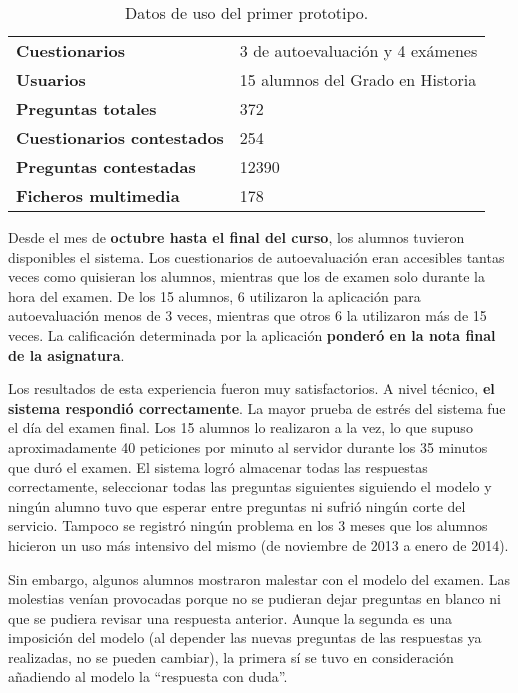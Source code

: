 \begin{table}[hc]
	\centering
	\begin{tabular}{l|l}
		{\bf Cuestionarios}             & 3 de autoevaluación y 4 exámenes \\ 
		{\bf Usuarios}                  & 15 alumnos del Grado en Historia \\
		{\bf Preguntas totales}         & 372                              \\ 
		{\bf Cuestionarios contestados} & 254                              \\ 
		{\bf Preguntas contestadas}     & 12390                            \\ 
		{\bf Ficheros multimedia}		& 178							   \\
	\end{tabular}
	\caption{Datos de uso del primer prototipo.}
\end{table}

Desde el mes de \textbf{octubre hasta el final del curso}, los alumnos tuvieron disponibles el sistema. Los cuestionarios de autoevaluación eran accesibles tantas veces como quisieran los alumnos, mientras que los de examen solo durante la hora del examen. De los 15 alumnos, 6 utilizaron la aplicación para autoevaluación menos de 3 veces, mientras que otros 6 la utilizaron más de 15 veces. La calificación determinada por la aplicación \textbf{ponderó en la nota final de la asignatura}.

Los resultados de esta experiencia fueron muy satisfactorios. A nivel técnico, \textbf{el sistema respondió correctamente}. La mayor prueba de estrés del sistema fue el día del examen final. Los 15 alumnos lo realizaron a la vez, lo que supuso aproximadamente 40 peticiones por minuto al servidor durante los 35 minutos que duró el examen. El sistema logró almacenar todas las respuestas correctamente, seleccionar todas las preguntas siguientes siguiendo el modelo y ningún alumno tuvo que esperar entre preguntas ni sufrió ningún corte del servicio. Tampoco se registró ningún problema en los 3 meses que los alumnos hicieron un uso más intensivo del mismo (de noviembre de 2013 a enero de 2014).

Sin embargo, algunos alumnos mostraron malestar con el modelo del examen. Las molestias venían provocadas porque no se pudieran dejar preguntas en blanco ni que se pudiera revisar una respuesta anterior. Aunque la segunda es una imposición del modelo (al depender las nuevas preguntas de las respuestas ya realizadas, no se pueden cambiar), la primera sí se tuvo en consideración añadiendo al modelo la ``respuesta con duda''.

